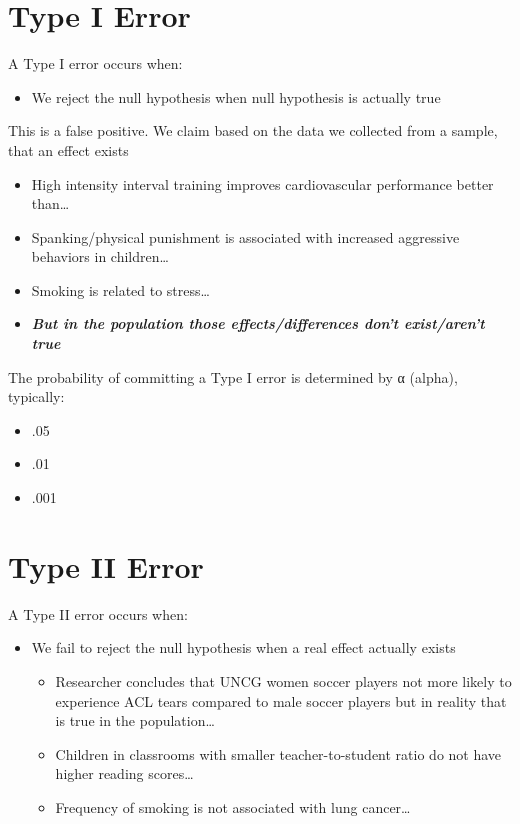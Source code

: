 \documentclass[
  letterpaper,
  DIV=11,
  numbers=noendperiod]{scrreprt}
\providecommand{\tightlist}{%
  \setlength{\itemsep}{0pt}\setlength{\parskip}{0pt}}
\begin{document}

\chapter{Type I Error}\label{type-i-error}

A Type I error occurs when:

\begin{itemize}
\tightlist
\item
  We reject the null hypothesis when null hypothesis is actually true
\end{itemize}

This is a false positive. We claim based on the data we collected from a
sample, that an effect exists

\begin{itemize}
\item
  High intensity interval training improves cardiovascular performance
  better than\ldots{}
\item
  Spanking/physical punishment is associated with increased aggressive
  behaviors in children\ldots{}
\item
  Smoking is related to stress\ldots{}
\item
  \textbf{\emph{But in the population those effects/differences don't
  exist/aren't true}}
\end{itemize}

The probability of committing a Type I error is determined by α (alpha),
typically:

\begin{itemize}
\tightlist
\item
  .05
\item
  .01
\item
  .001
\end{itemize}


\chapter{Type II Error}\label{type-ii-error}

A Type II error occurs when:

\begin{itemize}
\tightlist
\item
  We fail to reject the null hypothesis when a real effect actually
  exists

  \begin{itemize}
  \tightlist
  \item
    Researcher concludes that UNCG women soccer players not more likely
    to experience ACL tears compared to male soccer players but in
    reality that is true in the population\ldots{}
  \item
    Children in classrooms with smaller teacher-to-student ratio do not
    have higher reading scores\ldots{}
  \item
    Frequency of smoking is not associated with lung cancer\ldots{}
  \end{itemize}
\end{itemize}
\end{document}
